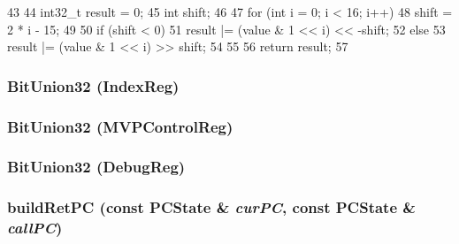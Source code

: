 \begin{DoxyCode}
43 {
44     int32_t result = 0;
45     int shift;
46 
47     for (int i = 0; i < 16; i++) {
48         shift = 2 * i - 15;
49 
50         if (shift < 0)
51             result |= (value & 1 << i) << -shift;
52         else
53             result |= (value & 1 << i) >> shift;
54     }
55 
56     return result;
57 }
\end{DoxyCode}
\hypertarget{namespaceMipsISA_a5318fa590b967d1cce26803bf9539c46}{
\subsubsection[{BitUnion32}]{\setlength{\rightskip}{0pt plus 5cm}BitUnion32 (IndexReg)}}
\label{namespaceMipsISA_a5318fa590b967d1cce26803bf9539c46}
\hypertarget{namespaceMipsISA_a9c38a1dd425d938646c1e57e919ee830}{
\subsubsection[{BitUnion32}]{\setlength{\rightskip}{0pt plus 5cm}BitUnion32 (MVPControlReg)}}
\label{namespaceMipsISA_a9c38a1dd425d938646c1e57e919ee830}
\hypertarget{namespaceMipsISA_ab29959b11b97e2f28ab81dda7a828367}{
\subsubsection[{BitUnion32}]{\setlength{\rightskip}{0pt plus 5cm}BitUnion32 (DebugReg)}}
\label{namespaceMipsISA_ab29959b11b97e2f28ab81dda7a828367}
\hypertarget{namespaceMipsISA_a2f28a29005a886eacf4d9d5c44ca111e}{
\subsubsection[{buildRetPC}]{ buildRetPC (const PCState \& {\em curPC}, \/  const PCState \& {\em callPC})}}
\label{namespaceMipsISA_a2f28a29005a886eacf4d9d5c44ca111e}



